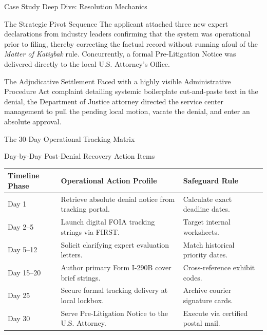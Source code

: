 \documentclass[11pt]{beamer}
\begin{document}
	\begin{frame}{Case Study Deep Dive: Resolution Mechanics}
		\scriptsize
		\begin{block}{The Strategic Pivot Sequence}
			The applicant attached three new expert declarations from industry leaders confirming that the system was operational prior to filing, thereby correcting the factual record without running afoul of the \textit{Matter of Katigbak} rule. Concurrently, a formal Pre-Litigation Notice was delivered directly to the local U.S. Attorney’s Office.
		\end{block}
		\begin{block}{The Adjudicative Settlement}
			Faced with a highly visible Administrative Procedure Act complaint detailing systemic boilerplate cut-and-paste text in the denial, the Department of Justice attorney directed the service center management to pull the pending local motion, vacate the denial, and enter an absolute approval.
		\end{block}
	\end{frame}
	
	\begin{frame}{The 30-Day Operational Tracking Matrix}
		\scriptsize
		\begin{block}{Day-by-Day Post-Denial Recovery Action Items}
			\centering
			\begin{tabular}{|p{2cm}|p{6cm}|p{3cm}|}
				\hline
				\textbf{Timeline Phase} & \textbf{Operational Action Profile} & \textbf{Safeguard Rule} \\
				\hline
				Day 1 & Retrieve absolute denial notice from tracking portal. & Calculate exact deadline dates. \\
				\hline
				Day 2--5 & Launch digital FOIA tracking strings via FIRST. & Target internal worksheets. \\
				\hline
				Day 5--12 & Solicit clarifying expert evaluation letters. & Match historical priority dates. \\
				\hline
				Day 15--20 & Author primary Form I-290B cover brief strings. & Cross-reference exhibit codes. \\
				\hline
				Day 25 & Secure formal tracking delivery at local lockbox. & Archive courier signature cards. \\
				\hline
				Day 30 & Serve Pre-Litigation Notice to the U.S. Attorney. & Execute via certified postal mail. \\
				\hline
			\end{tabular}
		\end{block}
	\end{frame}
	
\end{document}
